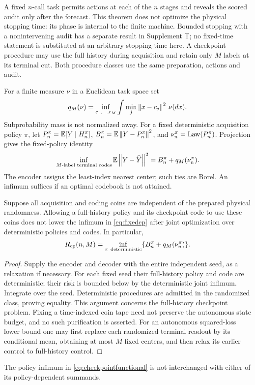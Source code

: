 A fixed $n$-call task permits actions at each of the $n$ stages and reveals the scored audit only after the forecast. This theorem does not optimize the physical stopping time: its phase is internal to the finite machine. Bounded stopping with a nonintervening audit has a separate result in Supplement T; no fixed-time statement is substituted at an arbitrary stopping time here. A checkpoint procedure may use the full history during acquisition and retain only $M$ labels at its terminal cut. Both procedure classes use the same preparation, actions and audit.

For a finite measure $\nu$ in a Euclidean task space set
\begin{equation}\label{eq:quantization}
 q_M(\nu)=\inf_{c_1,\ldots,c_M}\int\min_j\left\lVert x-c_j\right\rVert^2\,\nu(dx).
\end{equation}
Subprobability mass is not normalized away. For a fixed deterministic acquisition policy $\pi$, let $P_n^\pi=\mathbb E[Y\mid H_n^\pi]$, $B_n^\pi=\mathbb E\left\lVert Y-P_n^\pi\right\rVert^2$, and $\nu_n^\pi=\operatorname{Law}(P_n^\pi)$. Projection gives the fixed-policy identity
\begin{equation}\label{eq:fixedcp}
 \inf_{M\text{-label terminal codes}}\mathbb E\left\lVert Y-\widehat Y\right\rVert^2
       =B_n^\pi+q_M(\nu_n^\pi).
\end{equation}
The encoder assigns the least-index nearest center; such ties are Borel. An infimum suffices if an optimal codebook is not attained.

\begin{lemma}\label{lem:seeds}
Suppose all acquisition and coding coins are independent of the prepared physical randomness. Allowing a full-history policy and its checkpoint code to use these coins does not lower the infimum in \eqref{eq:fixedcp} after joint optimization over deterministic policies and codes. In particular,
\begin{equation}\label{eq:checkpointfunctional}
 R_{\mathrm{cp}}(n,M)=\inf_{\pi\ {\rm deterministic}}
             \{B_n^\pi+q_M(\nu_n^\pi)\}.
\end{equation}
\end{lemma}
\begin{proof}
Supply the encoder and decoder with the entire independent seed, as a relaxation if necessary. For each fixed seed their full-history policy and code are deterministic; their risk is bounded below by the deterministic joint infimum. Integrate over the seed. Deterministic procedures are admitted in the randomized class, proving equality. This argument concerns the full-history checkpoint problem. Fixing a time-indexed coin tape need not preserve the autonomous state budget, and no such purification is asserted. For an autonomous squared-loss lower bound one may first replace each randomized terminal readout by its conditional mean, obtaining at most $M$ fixed centers, and then relax its earlier control to full-history control.
\end{proof}
The policy infimum in \eqref{eq:checkpointfunctional} is not interchanged with either of its policy-dependent summands.
